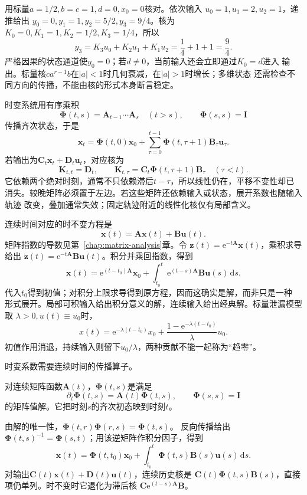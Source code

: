 用标量$a=1/2,b=c=1,d=0,x_0=0$核对。依次输入
$u_0=1,u_1=2,u_2=1$，递推给出
$y_0=0,y_1=1,y_2=5/2,y_3=9/4$。核为
$K_0=0,K_1=1,K_2=1/2,K_3=1/4$，所以
\[
  y_3=K_3u_0+K_2u_1+K_1u_2=\frac14+1+1=\frac94.
\]
严格因果的状态通道使$y_0=0$；若$d\neq0$，当前输入还会立即通过$K_0=d$进入
输出。标量核$ca^{r-1}b$在$|a|<1$时几何衰减，在$|a|>1$时增长；多维状态
还需检查不同方向的传播，不能由核的形式本身断言稳定。

时变系统用有序乘积
\[
  \bm\Phi(t,s)=\bm A_{t-1}\cdots\bm A_s\quad(t>s),\qquad
  \bm\Phi(s,s)=\bm I
\]
传播齐次状态，于是
\[
  \bm x_t=\bm\Phi(t,0)\bm x_0+
    \sum_{\tau=0}^{t-1}\bm\Phi(t,\tau+1)\bm B_\tau\bm u_\tau.
\]
若输出为$\bm C_t\bm x_t+\bm D_t\bm u_t$，对应核为
\[
  \bm K_{t,t}=\bm D_t,\qquad
  \bm K_{t,\tau}=\bm C_t\bm\Phi(t,\tau+1)\bm B_\tau\quad(\tau<t).
\]
它依赖两个绝对时刻，通常不只依赖滞后$t-\tau$，所以线性仍在，平移不变性却已
消失。较晚矩阵必须置于左边。若这些矩阵还依赖输入或状态，展开系数也随输入轨迹
改变，叠加通常失效；固定轨迹附近的线性化核仅有局部含义。

连续时间对应的时不变方程是
\begin{equation}
  \dot{\bm x}(t)=\bm A\bm x(t)+\bm B\bm u(t).
  \label{eq:dynamical-lti-continuous}
\end{equation}
矩阵指数的导数见第~\ref{chap:matrix-analysis}章。令
$\bm z(t)=\mathrm e^{-t\bm A}\bm x(t)$，乘积求导给出
$\dot{\bm z}(t)=\mathrm e^{-t\bm A}\bm B\bm u(t)$。积分并乘回指数，得到
\begin{equation}
  \bm x(t)=\mathrm e^{(t-t_0)\bm A}\bm x_0+
    \int_{t_0}^t\mathrm e^{(t-s)\bm A}\bm B\bm u(s)\,\mathrm ds.
  \label{eq:dynamical-lti-variation-constants}
\end{equation}
代入$t_0$得到初值；对积分上限求导得到原方程，因而这确实是解，而非只是一种
形式展开。局部可积输入给出积分意义的解，连续输入给出经典解。标量泄漏模型取
$\lambda>0,u(t)\equiv u_0$时，
\[
  x(t)=\mathrm e^{-\lambda(t-t_0)}x_0+
    \frac{1-\mathrm e^{-\lambda(t-t_0)}}{\lambda}u_0.
\]
初值作用消退，持续输入则留下$u_0/\lambda$，两种贡献不能一起称为“趋零”。

时变系数需要连续时间的传播算子。
\begin{definition}[状态转移矩阵]
  \label{def:dynamical-state-transition-matrix}
  对连续矩阵函数$\bm A(t)$，$\bm\Phi(t,s)$是满足
  \begin{equation}
    \partial_t\bm\Phi(t,s)=\bm A(t)\bm\Phi(t,s),\qquad
    \bm\Phi(s,s)=\bm I
    \label{eq:dynamical-state-transition-matrix}
  \end{equation}
  的矩阵值解。它把时刻$s$的齐次初态映到时刻$t$。
\end{definition}
由解的唯一性，$\bm\Phi(t,r)\bm\Phi(r,s)=\bm\Phi(t,s)$。
反向传播给出$\bm\Phi(t,s)^{-1}=\bm\Phi(s,t)$；用该逆矩阵作积分因子，得到
\begin{equation}
  \bm x(t)=\bm\Phi(t,t_0)\bm x_0+
    \int_{t_0}^t\bm\Phi(t,s)\bm B(s)\bm u(s)\,\mathrm ds.
  \label{eq:dynamical-ltv-variation-constants}
\end{equation}
对输出$\bm C(t)\bm x(t)+\bm D(t)\bm u(t)$，连续历史核是
$\bm C(t)\bm\Phi(t,s)\bm B(s)$，直接项仍单列。时不变时它退化为滞后核
$\bm C\mathrm e^{(t-s)\bm A}\bm B$。

